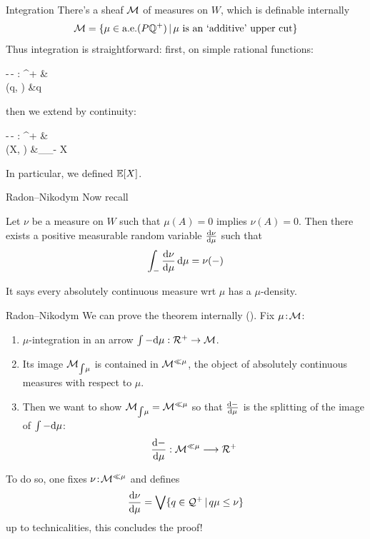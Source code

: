 \begin{frame}{Integration}
	There's a sheaf $\mathcal{M}$ of measures on $W$, which is definable internally
	\begin{equation*}
		\mathcal{M} = \{ \mu \in \text{a.e.}(P\mathbb{Q}^+) \,|\, \text{$\mu$ is an `additive' upper cut}\}
	\end{equation*}
	Thus integration is straightforward: first, on simple rational functions:
	\begin{eqalign*}
		\int -\,\de - : \QNO^+ \times \M &\longto \M\\
		(q, \mu) &\longmapsto q \mu
	\end{eqalign*}
	then we extend by continuity:
	\begin{eqalign*}
		\int -\,\de - : \RNO^+ \times \M &\longto \M\\
		(X, \mu) &\longmapsto {}_{\color{colorgold}\int_{-} X\,\de\mu}
	\end{eqalign*}
	In particular, we defined $\mathbb{E}[X]$.
\end{frame}

\begin{frame}{Radon--Nikodym}
	Now recall

	\vfill
	\begin{theorem}
		Let $\nu$ be a measure on $W$ such that $\mu(A) = 0$ implies $\nu(A) = 0$.
		Then there exists a positive measurable random variable $\frac{\mathrm{d}{\nu}}{\mathrm{d}{\mu}}$ such that
		\begin{equation*}
			\int_{-} \frac{\mathrm{d}{\nu}}{\mathrm{d}{\mu}} \, \mathrm{d} \mu = \nu(-)
		\end{equation*}
	\end{theorem}

	\vfill
	It says every absolutely continuous measure wrt $\mu$ has a $\mu$-density.
\end{frame}

\begin{frame}{Radon--Nikodym}
	We can prove the theorem internally (\cite{jackson2006sheaf}).
	Fix $\mu \!:\! \mathcal{M}$:
	\begin{enumerate}
		\item $\mu$-integration in an arrow $\int - \mathrm{d} \mu : \mathcal{R}^+ \to \mathcal{M}$.
		\item Its image $\mathcal{M}_{\int\!\mu}$ is contained in $\mathcal{M}^{\ll \mu}$, the object of absolutely continuous measures with respect to $\mu$.
		\item Then we want to show $\mathcal{M}_{\int\!\mu} = \mathcal{M}^{\ll \mu}$ so that $\frac{\mathrm{d}{-}}{\mathrm{d}{\mu}}$ is the splitting of the image of $\int - \mathrm{d} \mu$:
		\begin{equation*}
			\frac{\mathrm{d}{-}}{\mathrm{d}{\mu}} : \mathcal{M}^{\ll \mu} \longrightarrow \mathcal{R}^+
		\end{equation*}
	\end{enumerate}
	To do so, one fixes $\nu \!:\! \mathcal{M}^{\ll \mu}$ and defines
	\begin{equation*}
		\frac{\mathrm{d}{\nu}}{\mathrm{d}{\mu}} = \bigvee \{q \in \mathcal{Q}^+ \,|\, q \mu \leq \nu\}
	\end{equation*}
	up to technicalities, this concludes the proof!
\end{frame}

